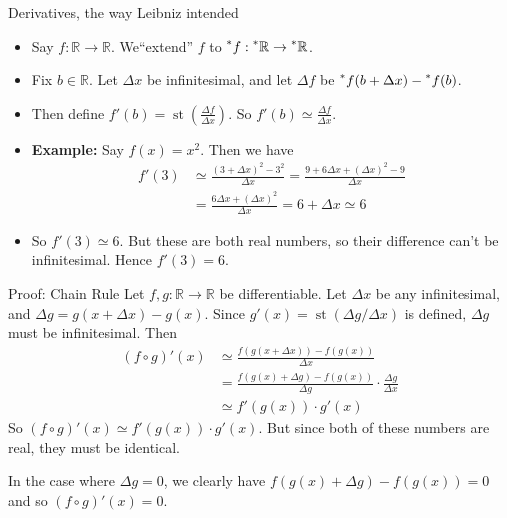 \documentclass{beamer}
\theoremstyle{plain}
\theoremstyle{definition}
\newcommand{\stp}[1]{\st\left(#1\right)}
\newcommand{\reals}{\mathbb{R}}
\newcommand{\hreals}{\prescript{*}{}{\mathbb{R}}}
\newcommand{\hr}[1]{\prescript{*}{}{#1}}
\DeclareMathOperator{\st}{st}
\begin{document}
\begin{frame}{Derivatives, the way Leibniz intended}
\begin{itemize}
	\item Say $f: \reals \to \reals$. We``extend'' $f$ to $\hr{f}: \hreals \to \hreals$.
	\item Fix $b \in \reals$. Let $\Delta x$ be infinitesimal, and let $\Delta f$ be $\hr{f}(b + \Delta x) - \hr{f}(b)$.
	\item Then define $f'(b) = \stp{\frac{\Delta f}{\Delta x}}$. So $f'(b) \simeq \frac{\Delta f}{\Delta x}$.
	\item \textbf{Example:} Say $f(x) = x^2$. Then we have 
	\begin{align*}
	f'(3) &\simeq \frac{(3 + \Delta x)^2 - 3^2}{\Delta x} = \frac{9 + 6 \Delta x + (\Delta x)^2 - 9}{\Delta x} \\
		&= \frac{6 \Delta x + (\Delta x)^2}{\Delta x} = 6 + \Delta x \simeq 6
	\end{align*}
	\item So $f'(3) \simeq 6$. But these are both real numbers, so their difference can't be infinitesimal. Hence $f'(3) = 6$.
\end{itemize}
\end{frame}

\begin{frame}{Proof: Chain Rule}
Let $f,g: \reals \to \reals$ be differentiable. Let $\Delta x$ be any infinitesimal, and $\Delta g = g(x + \Delta x) - g(x)$. Since $g'(x) = \st(\Delta g / \Delta x)$ is defined, $\Delta g$ must be infinitesimal. Then
\begin{align*}
(f \circ g)'(x) &\simeq \frac{f(g(x + \Delta x)) - f(g(x))}{\Delta x}  \\
	&= \frac{f(g(x) + \Delta g) - f(g(x))}{\Delta g} \cdot \frac{\Delta g}{\Delta x} \\ 
	&\simeq f'(g(x))\cdot g'(x)
\end{align*}
So $(f \circ g)'(x) \simeq f'(g(x)) \cdot g'(x)$. But since both of these numbers are real, they must be identical. \newline

In the case where $\Delta g = 0$, we clearly have $f(g(x) + \Delta g) - f(g(x)) = 0$ and so $(f \circ g)'(x) = 0$.
\end{frame}
\end{document}
